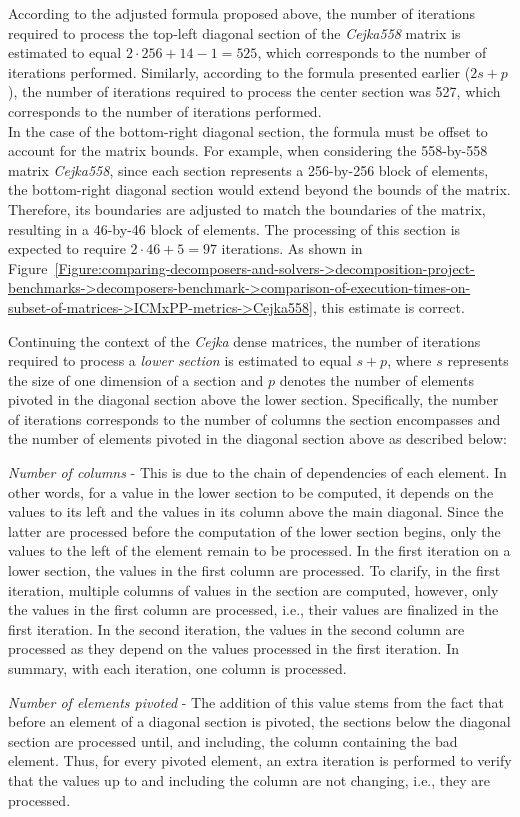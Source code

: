 According to the adjusted formula proposed above, the number of iterations required to process the top-left diagonal section of the \textit{Cejka558} matrix is estimated to equal $2\cdot 256 + 14 - 1 = 525$, which corresponds to the number of iterations performed.
Similarly, according to the formula presented earlier ($2s + p$), the number of iterations required to process the center section was 527, which corresponds to the number of iterations performed.\\
In the case of the bottom-right diagonal section, the formula must be offset to account for the matrix bounds.
For example, when considering the 558-by-558 matrix \textit{Cejka558}, since each section represents a 256-by-256 block of elements, the bottom-right diagonal section would extend beyond the bounds of the matrix.
Therefore, its boundaries are adjusted to match the boundaries of the matrix, resulting in a 46-by-46 block of elements.
The processing of this section is expected to require $2\cdot 46 + 5 = 97$ iterations.
As shown in Figure~\ref{Figure:comparing-decomposers-and-solvers->decomposition-project-benchmarks->decomposers-benchmark->comparison-of-execution-times-on-subset-of-matrices->ICMxPP-metrics->Cejka558}, this estimate is correct.

Continuing the context of the \textit{Cejka} dense matrices, the number of iterations required to process a \textit{lower section} is estimated to equal $s + p$, where $s$ represents the size of one dimension of a section and $p$ denotes the number of elements pivoted in the diagonal section above the lower section.
Specifically, the number of iterations corresponds to the number of columns the section encompasses and the number of elements pivoted in the diagonal section above as described below:
%
\begin{tight_itemize}
	\item \textit{Number of columns} - This is due to the chain of dependencies of each element.
		In other words, for a value in the lower section to be computed, it depends on the values to its left and the values in its column above the main diagonal.
		Since the latter are processed before the computation of the lower section begins, only the values to the left of the element remain to be processed.
		In the first iteration on a lower section, the values in the first column are processed.
		To clarify, in the first iteration, multiple columns of values in the section are computed, however, only the values in the first column are processed, i.e., their values are finalized in the first iteration.
		In the second iteration, the values in the second column are processed as they depend on the values processed in the first iteration.
		In summary, with each iteration, one column is processed.
	\item \textit{Number of elements pivoted} - The addition of this value stems from the fact that before an element of a diagonal section is pivoted, the sections below the diagonal section are processed until, and including, the column containing the bad element.
		Thus, for every pivoted element, an extra iteration is performed to verify that the values up to and including the column are not changing, i.e., they are processed.
\end{tight_itemize}

